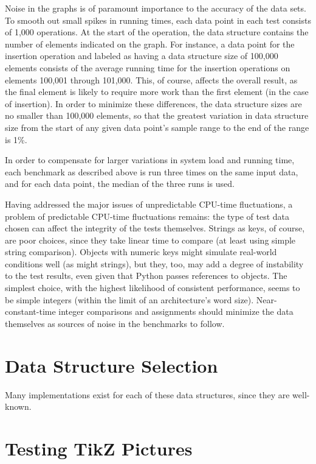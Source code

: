 \documentclass{article}
\begin{document}
Noise in the graphs is of paramount importance to the accuracy of the data sets. To smooth out small spikes in running times, each data point in each test consists of 1,000 operations. At the start of the operation, the data structure contains the number of elements indicated on the graph. For instance, a data point for the insertion operation and labeled as having a data structure size of 100,000 elements consists of the average running time for the insertion operations on elements 100,001 through 101,000. This, of course, affects the overall result, as the final element is likely to require more work than the first element (in the case of insertion). In order to minimize these differences, the data structure sizes are no smaller than 100,000 elements, so that the greatest variation in data structure size from the start of any given data point's sample range to the end of the range is 1\%.

In order to compensate for larger variations in system load and running time, each benchmark as described above is run three times on the same input data, and for each data point, the median of the three runs is used.

Having addressed the major issues of unpredictable CPU-time fluctuations, a problem of predictable CPU-time fluctuations remains: the type of test data chosen can affect the integrity of the tests themselves. Strings as keys, of course, are poor choices, since they take linear time to compare (at least using simple string comparison). Objects with numeric keys might simulate real-world conditions well (as might strings), but they, too, may add a degree of instability to the test results, even given that Python passes references to objects. The simplest choice, with the highest likelihood of consistent performance, seems to be simple integers (within the limit of an architecture's word size). Near-constant-time integer comparisons and assignments should minimize the data themselves as sources of noise in the benchmarks to follow.

\section{Data Structure Selection}
Many implementations exist for each of these data structures, since they are well-known. 

\newpage
\section{Testing TikZ Pictures}


\end{document}
